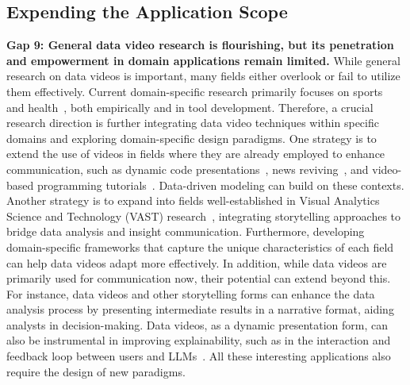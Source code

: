 

\subsection{Expending the Application Scope}
\textbf{Gap 9: General data video research is flourishing, but its penetration and empowerment in domain applications remain limited.}
While general research on data videos is important, many fields either overlook or fail to utilize them effectively. 
Current domain-specific research primarily focuses on sports~\cite{Chen2022c,Chen2023d,Chen2022h,Lin2023b,Lin2023a, Yao2024} and health~\cite{Sakamoto2022, Sallam2022}, both empirically and in tool development.
Therefore, a crucial research direction is further integrating data video techniques within specific domains and exploring domain-specific design paradigms. 
One strategy is to extend the use of videos in fields where they are already employed to enhance communication, such as dynamic code presentations~\cite{NotePlayer}, news reviving~\cite{Wang2024f}, and video-based programming tutorials~\cite{Chi2022}. Data-driven modeling can build on these contexts. 
Another strategy is to expand into fields well-established in Visual Analytics Science and Technology (VAST) research~\cite{munzner2014visualization}, integrating storytelling approaches to bridge data analysis and insight communication.
Furthermore, developing domain-specific frameworks that capture the unique characteristics of each field can help data videos adapt more effectively.
In addition, while data videos are primarily used for communication now, their potential can extend beyond this. For instance, data videos and other storytelling forms can enhance the data analysis process by presenting intermediate results in a narrative format, aiding analysts in decision-making. Data videos, as a dynamic presentation form, can also be instrumental in improving explainability, such as in the interaction and feedback loop between users and LLMs~\cite{xie2024waitgpt}. All these interesting applications also require the design of new paradigms.

